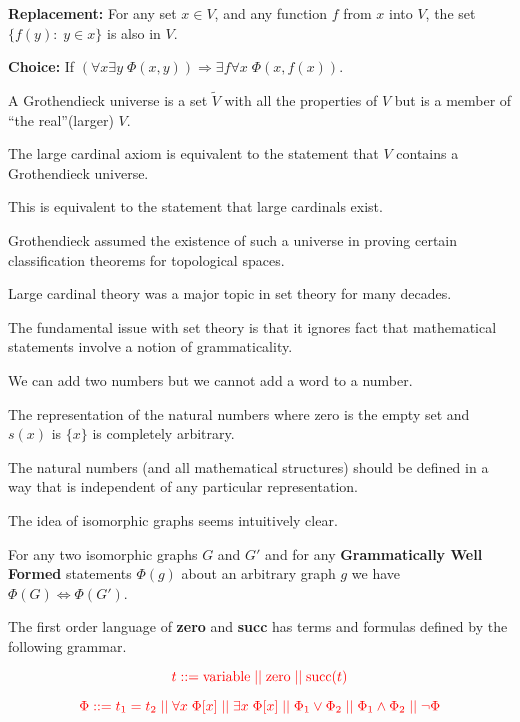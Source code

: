 {\vfill
{\bf Replacement:} For any set $x \in V$, and any function $f$ from $x$ into $V$, the set $\{f(y):\;y \in x\}$ is also in $V$.

\vfill
{\bf Choice:} If $(\forall x \exists y\;\Phi(x,y)) \Rightarrow \exists f \forall x \;\Phi(x,f(x))$.


A Grothendieck universe is a set $\tilde{V}$ with all the properties of $V$ but is a member of ``the real''(larger) $V$.

\vfill
The large cardinal axiom is equivalent to the statement that $V$ contains a Grothendieck universe.

\vfill
This is equivalent to the statement that large cardinals exist.

\vfill
Grothendieck assumed the existence of such a universe in proving certain classification theorems for topological spaces.

\vfill
Large cardinal theory was a major topic in set theory for many decades.


The fundamental issue with set theory is that it ignores fact that mathematical statements
involve a notion of grammaticality.

\vfill
We can add two numbers but we cannot add a word to a number.

\vfill
The representation of the natural numbers where zero is the empty set and $s(x)$ is $\{x\}$ is completely arbitrary.

\vfill
The natural numbers (and all mathematical structures) should be defined in a way that is independent of any particular
representation.


\vfill
The idea of isomorphic graphs seems intuitively clear.

\vfill
For any two isomorphic graphs $G$ and $G'$ and for any {\bf Grammatically Well Formed} statements $\Phi(g)$ about an arbitrary graph $g$
we have $\Phi(G) \Leftrightarrow \Phi(G')$.


The first order language  of {\bf zero} and {\bf succ} has terms and formulas
defined by the following grammar.

$${\color{red} t
::= \mathrm{variable} \;||\; \mathrm{zero} \;||\; \mathrm{succ}(t)}$$

$${\color{red} \Phi ::= t_1=t_2 \;||\; \forall x\; \Phi[x] \;||\; \exists x\; \Phi[x] \;||\; \Phi_1 \vee \Phi_2 \;||\; \Phi_1 \wedge \Phi_2 \;||\; \neg \Phi}$$


}
